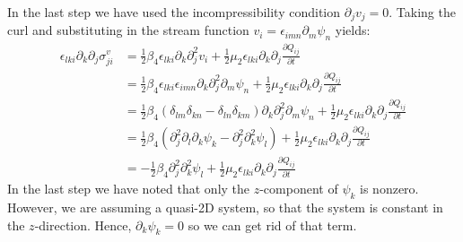 \documentclass[reqno]{article}
\begin{document}
In the last step we have used the incompressibility condition $\partial_j v_j = 0$. 
Taking the curl and substituting in the stream function $v_i = \epsilon_{imn} \partial_m \psi_n$ yields:
\begin{equation}
\begin{split}
	\epsilon_{lki} \partial_k \partial_j \sigma^v_{ji}
	&= \tfrac12 \beta_4 \epsilon_{lki} \partial_k \partial_j^2 v_i
	+ \tfrac12 \mu_2 \epsilon_{lki} \partial_k \partial_j \frac{\partial Q_{ij}}{\partial t} \\
	&= \tfrac12 \beta_4 \epsilon_{lki} \epsilon_{imn} \partial_k \partial_j^2 \partial_m \psi_n
	+ \tfrac12 \mu_2 \epsilon_{lki} \partial_k \partial_j \frac{\partial Q_{ij}}{\partial t} \\
	&= \tfrac12 \beta_4 
	\left( \delta_{lm} \delta_{kn} - \delta_{ln} \delta_{km} \right)
	\partial_k \partial_j^2 \partial_m \psi_n
	+ \tfrac12 \mu_2 \epsilon_{lki} \partial_k \partial_j \frac{\partial Q_{ij}}{\partial t} \\
	&= \tfrac12 \beta_4 \left(
	\partial_j^2 \partial_l \partial_k \psi_k
	- \partial_j^2 \partial_k^2 \psi_l
	\right)
	+ \tfrac12 \mu_2 \epsilon_{lki} \partial_k \partial_j \frac{\partial Q_{ij}}{\partial t} \\
	&= - \tfrac12 \beta_4 \partial_j^2 \partial_k^2 \psi_l
	+ \tfrac12 \mu_2 \epsilon_{lki} \partial_k \partial_j \frac{\partial Q_{ij}}{\partial t}
\end{split}
\end{equation}
In the last step we have noted that only the $z$-component of $\psi_k$ is nonzero.
However, we are assuming a quasi-2D system, so that the system is constant in the $z$-direction.
Hence, $\partial_k \psi_k = 0$ so we can get rid of that term.
\end{document}
